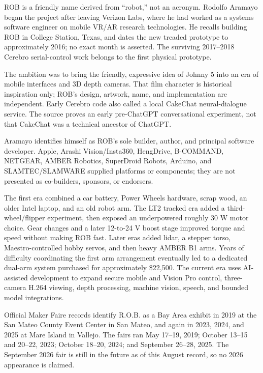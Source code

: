 \documentclass[10pt,openany]{book}
\begin{document}
\clearpage
\begin{fieldnotebox}[title={THE BUILDER'S ACCOUNT}]
ROB is a friendly name derived from ``robot,'' not an acronym. Rodolfo Aramayo began the project after leaving Verizon Labs, where he had worked as a systems software engineer on mobile VR/AR research technologies. He recalls building ROB in College Station, Texas, and dates the new treaded prototype to approximately 2016; no exact month is asserted. The surviving 2017--2018 Cerebro serial-control work belongs to the first physical prototype.

The ambition was to bring the friendly, expressive idea of Johnny 5 into an era of mobile interfaces and 3D depth cameras. That film character is historical inspiration only; ROB's design, artwork, name, and implementation are independent. Early Cerebro code also called a local CakeChat neural-dialogue service. The source proves an early pre-ChatGPT conversational experiment, not that CakeChat was a technical ancestor of ChatGPT.

Aramayo identifies himself as ROB's sole builder, author, and principal software developer. Apple, Arashi Vision/Insta360, HengDrive, B-COMMAND, NETGEAR, AMBER Robotics, SuperDroid Robots, Arduino, and SLAMTEC/SLAMWARE supplied platforms or components; they are not presented as co-builders, sponsors, or endorsers.

The first era combined a car battery, Power Wheels hardware, scrap wood, an older Intel laptop, and an old robot arm. The LT2 tracked era added a third-wheel/flipper experiment, then exposed an underpowered roughly 30 W motor choice. Gear changes and a later 12-to-24 V boost stage improved torque and speed without making ROB fast. Later eras added lidar, a stepper torso, Maestro-controlled hobby servos, and then heavy AMBER B1 arms. Years of difficulty coordinating the first arm arrangement eventually led to a dedicated dual-arm system purchased for approximately \$22{,}500. The current era uses AI-assisted development to expand secure mobile and Vision Pro control, three-camera H.264 viewing, depth processing, machine vision, speech, and bounded model integrations.

Official Maker Faire records identify R.O.B. as a Bay Area exhibit in 2019 at the San Mateo County Event Center in San Mateo, and again in 2023, 2024, and 2025 at Mare Island in Vallejo. The fairs ran May 17--19, 2019; October 13--15 and 20--22, 2023; October 18--20, 2024; and September 26--28, 2025. The September 2026 fair is still in the future as of this August record, so no 2026 appearance is claimed.
\end{fieldnotebox}
\end{document}
